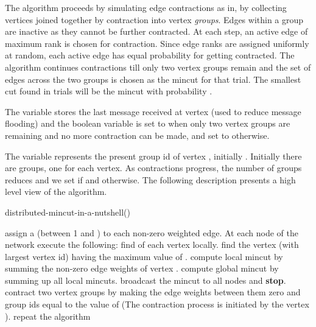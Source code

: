 \documentclass{acm_proc_article-sp}
\begin{document}
The algorithm proceeds by simulating edge contractions as in\cite{NRMM97}, by collecting vertices joined together by contraction into vertex {\em groups}. Edges within a group are inactive as they cannot be further contracted. At each step, an active edge of maximum rank is chosen for contraction. Since edge ranks are assigned uniformly at random, each active edge has equal probability for getting contracted. The algorithm continues contractions till only two vertex groups remain and the set of edges across the two groups is chosen as the mincut for that trial. The smallest cut found in  trials will be the mincut with probability .

The variable  stores the last message received at vertex (used to reduce message flooding) and the boolean variable  is set to  when only two vertex groups are remaining and no more contraction can be made, and set to  otherwise.

The variable  represents the present group id of vertex , initially . Initially there are  groups, one for each vertex. As contractions progress, the number of groups reduces and we set  if  and  otherwise.  The following description presents a high level view of the algorithm.


\begin{algorithm}                      \caption{distributed-mincut-in-a-nutshell()}   \label{alg1}                           \begin{algorithmic}
\STATE assign a  (between 1 and ) to each non-zero weighted edge. 
\STATE At each node  of the network execute the following:
\STATE find  of each vertex  locally. 
\STATE find the vertex (with largest vertex id) having the maximum value of . 
\STATE compute local mincut  by summing the non-zero edge weights of vertex . 
\STATE compute global mincut by summing up all local mincuts. 
\STATE broadcast the mincut to all nodes and \textbf{stop}. 
\ELSE
\STATE contract two vertex groups by making the edge weights between them zero and group ids equal to the value of  (The contraction process is initiated by the vertex ). 
\STATE repeat the algorithm
\ENDIF
\end{algorithmic}
\end{algorithm}
\end{document}
